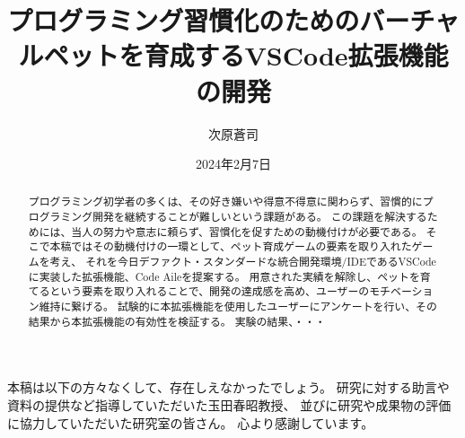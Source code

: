 \documentclass[12pt,twoside]{jbook}
\begin{document}
\title{%
  プログラミング習慣化のためのバーチャルペットを育成するVSCode拡張機能の開発
}


\author{%
  次原蒼司
}

\date{2024年2月7日}






\maketitle


\begin{abstract}
 プログラミング初学者の多くは、その好き嫌いや得意不得意に関わらず、習慣的にプログラミング開発を継続することが難しいという課題がある。
この課題を解決するためには、当人の努力や意志に頼らず、習慣化を促すための動機付けが必要である。
そこで本稿ではその動機付けの一環として、ペット育成ゲームの要素を取り入れたゲームを考え、
それを今日デファクト・スタンダードな統合開発環境/IDEであるVSCodeに実装した拡張機能、Code Aileを提案する。
用意された実績を解除し、ペットを育てるという要素を取り入れることで、開発の達成感を高め、ユーザーのモチベーション維持に繋げる。
試験的に本拡張機能を使用したユーザーにアンケートを行い、その結果から本拡張機能の有効性を検証する。
実験の結果、・・・

\end{abstract}

\begin{acknowledgments}
本稿は以下の方々なくして、存在しえなかったでしょう。
研究に対する助言や資料の提供など指導していただいた玉田春昭教授、
並びに研究や成果物の評価に協力していただいた研究室の皆さん。
心より感謝しています。

\end{acknowledgments}
\end{document}
